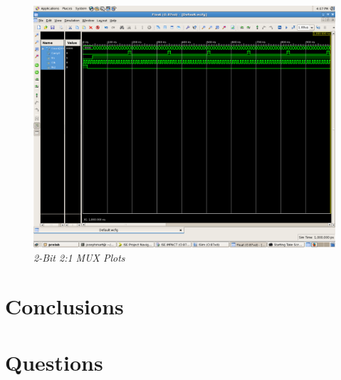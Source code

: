 \documentclass[a4paper,12pt]{article}
\begin{document}
\begin{figure}[h]
  \begin{center}
    \includegraphics[scale=.1]{up_Count_waveform.png}
    \caption{\textit{2-Bit 2:1 MUX Plots}}
  \end{center}
\end{figure}

\section*{Conclusions}


\section*{Questions}
\end{document}
